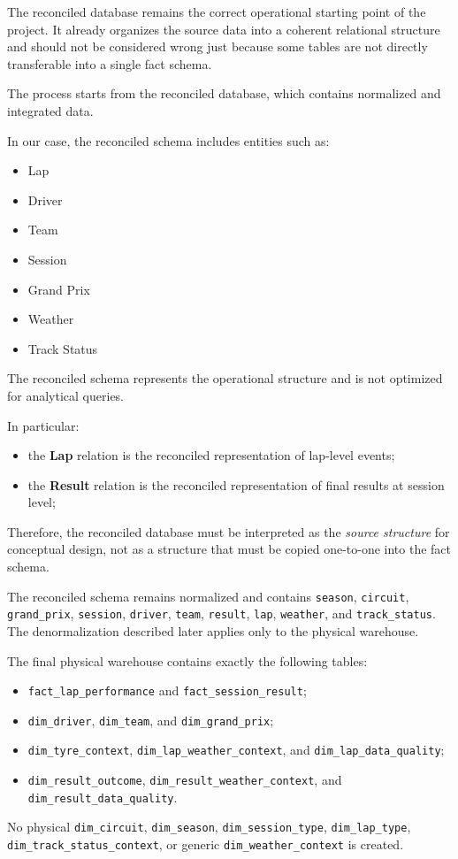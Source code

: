 \documentclass[a4paper,11pt]{article}
\begin{document}
	The reconciled database remains the correct operational starting point of the project. It already organizes the source data into a coherent relational structure and should not be considered wrong just because some tables are not directly transferable into a single fact schema.
	
	
	The process starts from the reconciled database, which contains normalized and integrated data.
	
	In our case, the reconciled schema includes entities such as:
	\begin{itemize}
		\item Lap
		\item Driver
		\item Team
		\item Session
		\item Grand Prix
		\item Weather
		\item Track Status
	\end{itemize}
	
	The reconciled schema represents the operational structure and is not optimized for analytical queries.
	
	In particular:
	\begin{itemize}[leftmargin=1.5em]
		\item the \textbf{Lap} relation is the reconciled representation of lap-level events;
		\item the \textbf{Result} relation is the reconciled representation of final results at session level;
	\end{itemize}
	
	Therefore, the reconciled database must be interpreted as the \emph{source structure} for conceptual design, not as a structure that must be copied one-to-one into the fact schema.

	The reconciled schema remains normalized and contains \texttt{season}, \texttt{circuit},
	\texttt{grand\_prix}, \texttt{session}, \texttt{driver}, \texttt{team},
	\texttt{result}, \texttt{lap}, \texttt{weather}, and \texttt{track\_status}. The
	denormalization described later applies only to the physical warehouse.

	The final physical warehouse contains exactly the following tables:
	\begin{itemize}
		\item \texttt{fact\_lap\_performance} and \texttt{fact\_session\_result};
		\item \texttt{dim\_driver}, \texttt{dim\_team}, and \texttt{dim\_grand\_prix};
		\item \texttt{dim\_tyre\_context}, \texttt{dim\_lap\_weather\_context}, and
		\texttt{dim\_lap\_data\_quality};
		\item \texttt{dim\_result\_outcome}, \texttt{dim\_result\_weather\_context}, and
		\texttt{dim\_result\_data\_quality}.
	\end{itemize}
	No physical \texttt{dim\_circuit}, \texttt{dim\_season}, \texttt{dim\_session\_type},
	\texttt{dim\_lap\_type}, \texttt{dim\_track\_status\_context}, or generic
	\texttt{dim\_weather\_context} is created.
	
\end{document}
